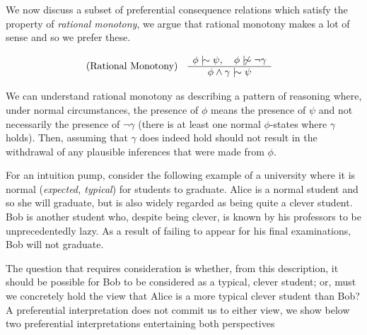 We now discuss a subset of preferential consequence relations which satisfy the property of \textit{rational monotony},
we argue that rational monotony makes a lot of sense and so we prefer these.

\begin{align}
	\inferLeft{Rational Monotony}{\phi \twiddle \psi, \quad \phi \ntwiddle \neg \gamma}{\phi \land \gamma \twiddle \psi}
\end{align}

We can understand rational monotony as describing a pattern of reasoning where, under normal circumstances, the presence
of $\phi$ means the presence of $\psi$ and not necessarily the presence of $\neg \gamma$ (there is at least one normal
$\phi$-states where $\gamma$ holds). Then, assuming that $\gamma$ does indeed hold should not result in the withdrawal of
any plausible inferences that were made from $\phi$.

For an intuition pump, consider the following example of a university where it is normal (\textit{expected, typical}) for
students to graduate. Alice is a normal student and so she will graduate, but is also widely regarded as being quite a clever
student. Bob is another student who, despite being clever, is known by his professors to be unprecedentedly lazy. As a result
of failing to appear for his final examinations, Bob will not graduate.

The question that requires consideration is whether, from this description, it should be possible for Bob to be
considered as a typical, clever student; or, must we concretely hold the view that Alice is a more typical clever student
than Bob? A preferential interpretation does not commit us to either view, we show below two preferential interpretations
entertaining both perspectives

